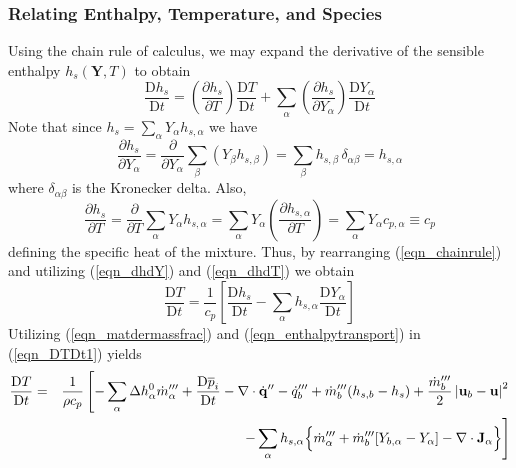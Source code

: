 \documentclass[11pt]{book}
\begin{document}
\subsubsection{Relating Enthalpy, Temperature, and Species}
\label{eqn_enthalpy_temperature}

Using the chain rule of calculus, we may expand the derivative of the sensible enthalpy $h_s(\mathbf{Y},T)$ to obtain
\begin{equation}
\label{eqn_chainrule}
\frac{\mbox{D} h_s}{\mbox{D} t} = \left(\frac{\partial h_s}{\partial T}\right) \frac{\mbox{D} T }{\mbox{D} t} +
\sum_\alpha \left( \frac{\partial h_s}{\partial Y_\alpha} \right) \frac{\mbox{D} Y_\alpha }{\mbox{D} t}
\end{equation}
Note that since $h_s = \sum_\alpha Y_\alpha h_{s,\alpha}$ we have
\begin{equation}
\label{eqn_dhdY}
\frac{\partial h_s}{\partial Y_\alpha} = \frac{\partial}{\partial Y_\alpha} \sum_\beta (Y_\beta h_{s,\beta} )
= \sum_\beta h_{s,\beta} \,\delta_{\alpha \beta} = h_{s,\alpha}
\end{equation}
where $\delta_{\alpha \beta}$ is the Kronecker delta. Also,
\begin{equation}
\label{eqn_dhdT}
\frac{\partial h_s}{\partial T} = \frac{\partial}{\partial T} \sum_\alpha Y_\alpha h_{s,\alpha} =
\sum_\alpha Y_\alpha \left(\frac{\partial h_{s,\alpha}}{\partial T}\right) = \sum_\alpha Y_\alpha c_{p,\alpha} \equiv c_p
\end{equation}
defining the specific heat of the mixture.  Thus, by rearranging (\ref{eqn_chainrule}) and utilizing (\ref{eqn_dhdY}) and (\ref{eqn_dhdT}) we obtain
\begin{equation}
\label{eqn_DTDt1}
\frac{\mbox{D} T}{\mbox{D} t} = \frac{1}{c_p} \left[ \frac{\mbox{D} h_s}{\mbox{D} t} - \sum_\alpha h_{s,\alpha} \frac{\mbox{D} Y_\alpha}{\mbox{D} t} \right]
\end{equation}
Utilizing (\ref{eqn_matdermassfrac}) and (\ref{eqn_enthalpytransport}) in (\ref{eqn_DTDt1}) yields
\begin{eqnarray}
\frac{\mbox{D} T}{\mbox{D} t} &=& \frac{1}{\rho c_p}   \left[  -\sum_\alpha \Delta h^0_\alpha \dot{m}_{\alpha}^{\tripleprime} + \frac{\mbox{D} \overline{p}_i }{\mbox{D} t} - \Div\dot{\mathbf{q}}^{\prime\prime} - \dq_b''' + \dot{m}_{b}^{\tripleprime} ( h_{s,b} - h_s )  + \frac{\dot{m}_{b}^{\tripleprime}}{2}\left|\mathbf{u}_b-\mathbf{u}\right|^2\right.   \nonumber \vspace{0.3cm} \\
& &  \quad\quad\,\, \left. - \sum_\alpha h_{s,\alpha} \Big\{  \dot{m}_\alpha^{\tripleprime} + \dot{m}_{b}^{\tripleprime}[Y_{b,\alpha} - Y_\alpha] - \Div \mathbf{J}_{\alpha} \Big\}  \right]
\label{eqn_DTDt2}
\end{eqnarray}
\end{document}
